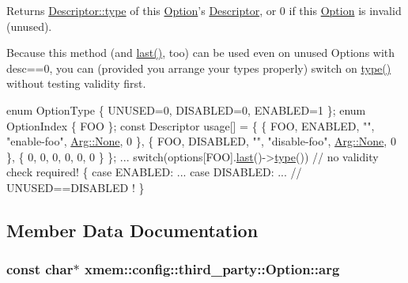 Returns \hyperlink{structxmem_1_1config_1_1third__party_1_1_descriptor_a4b9e9a5c9b08ef575ea4f603c54bff63}{Descriptor\-::type} of this \hyperlink{classxmem_1_1config_1_1third__party_1_1_option}{Option}'s \hyperlink{structxmem_1_1config_1_1third__party_1_1_descriptor}{Descriptor}, or 0 if this \hyperlink{classxmem_1_1config_1_1third__party_1_1_option}{Option} is invalid (unused). 

Because this method (and \hyperlink{classxmem_1_1config_1_1third__party_1_1_option_a79bd212eaf002df298da1b3b46e34cea}{last()}, too) can be used even on unused Options with desc==0, you can (provided you arrange your types properly) switch on \hyperlink{classxmem_1_1config_1_1third__party_1_1_option_a4d80ee182577f0dacfbd617cfd714833}{type()} without testing validity first. 
\begin{DoxyCode}
\textcolor{keyword}{enum} OptionType \{ UNUSED=0, DISABLED=0, ENABLED=1 \};
\textcolor{keyword}{enum} OptionIndex \{ FOO \};
\textcolor{keyword}{const} Descriptor usage[] = \{
  \{ FOO, ENABLED,  \textcolor{stringliteral}{""}, \textcolor{stringliteral}{"enable-foo"},  \hyperlink{structxmem_1_1config_1_1third__party_1_1_arg_afdfd4a0adea72c759ec04bf5feaf3ec0}{Arg::None}, 0 \},
  \{ FOO, DISABLED, \textcolor{stringliteral}{""}, \textcolor{stringliteral}{"disable-foo"}, \hyperlink{structxmem_1_1config_1_1third__party_1_1_arg_afdfd4a0adea72c759ec04bf5feaf3ec0}{Arg::None}, 0 \},
  \{ 0, 0, 0, 0, 0, 0 \} \};
...
switch(options[FOO].\hyperlink{classxmem_1_1config_1_1third__party_1_1_option_a79bd212eaf002df298da1b3b46e34cea}{last}()->\hyperlink{classxmem_1_1config_1_1third__party_1_1_option_a4d80ee182577f0dacfbd617cfd714833}{type}()) \textcolor{comment}{// no validity check required!}
\{
  \textcolor{keywordflow}{case} ENABLED: ...
  \textcolor{keywordflow}{case} DISABLED: ...  \textcolor{comment}{// UNUSED==DISABLED !}
\}
\end{DoxyCode}
 

\subsection{Member Data Documentation}
\hypertarget{classxmem_1_1config_1_1third__party_1_1_option_a409f63d66d900e594dd86bcdfa9fd86a}{
\subsubsection[{arg}]{\setlength{\rightskip}{0pt plus 5cm}const char$\ast$ xmem\-::config\-::third\-\_\-party\-::\-Option\-::arg}}\label{classxmem_1_1config_1_1third__party_1_1_option_a409f63d66d900e594dd86bcdfa9fd86a}


